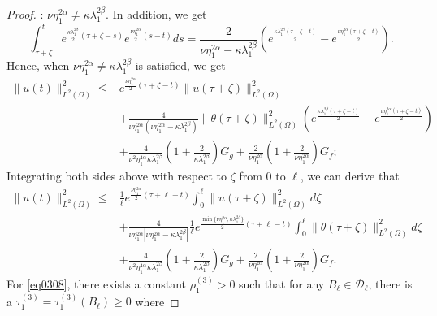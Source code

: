 \documentclass[10pt,a4paper]{amsart}
\begin{document}
\begin{proof}
: $\nu\eta_1^{2\alpha} \neq \kappa\lambda_1^{2\beta}$. In addition, we get
\[
\int_{\tau+\zeta}^{t} e^{\frac{\kappa\lambda_{1}^{2\beta}}{2}(\tau+\zeta-s)} e^{\frac{\nu\eta_1^{2\alpha}}{2}(s-t)} ds = \frac{2}{\nu\eta_1^{2\alpha} - \kappa\lambda_1^{2\beta}} \left( e^{\frac{\kappa\lambda_1^{2\beta}(\tau + \zeta - t)}{2}} - e^{\frac{\nu\eta_1^{2\alpha}(\tau + \zeta - t)}{2}} \right).
\]
Hence, when  \(\nu\eta_1^{2\alpha} \neq \kappa\lambda_1^{2\beta}\) is satisfied, we get
\begin{equation}\label{eq0305}
\begin{aligned} 
   \|u(t)\|_{L^2(\Omega)}^2
   \leq 
   & e^{\frac{\nu\eta_1^{2\alpha}}{2}(\tau+\zeta-t)} \|u(\tau+\zeta)\|_{L^2(\Omega)}^2 
    \\
   &
   + \frac{4}{\nu\eta_1^{2\alpha}(\nu\eta_1^{2\alpha} - \kappa\lambda_1^{2\beta})} \|\theta(\tau+\zeta)\|_{L^2(\Omega)}^2 
   \left( e^{\frac{\kappa\lambda_1^{2\beta}(\tau + \zeta - t)}{2}} - e^{\frac{\nu\eta_1^{2\alpha}(\tau + \zeta - t)}{2}} \right) \\
   &
   + \frac{4}{\nu^{2}\eta_1^{4\alpha}\kappa\lambda_{1}^{2\beta}}
   \left(1+\frac{2}{\kappa\lambda_{1}^{2\beta}}\right)
   G_g
   + \frac{2}{\nu\eta_1^{2\alpha}} \left(1+\frac{2}{\nu\eta_1^{2\alpha}}\right)G_f;
\end{aligned}
\end{equation}
Integrating both sides above with respect to $\zeta$ from $0$ to $\ell$, we can derive that
\begin{equation}\label{eq0308}
\begin{aligned} 
   \|u(t)\|_{L^2(\Omega)}^2
   \leq 
   & \frac{1}{\ell} e^{\frac{\nu\eta_1^{2\alpha}}{2}(\tau+\ell-t)}  \int_{0}^{\ell} \|u(\tau+\zeta)\|_{L^2(\Omega)}^2 d\zeta
    \\
   &
   + \frac{4}{\nu\eta_1^{2\alpha}|\nu\eta_1^{2\alpha} - \kappa\lambda_1^{2\beta}|}  
   \frac{1}{\ell}
   e^{\frac{\min\{\nu\eta_1^{2\alpha},\kappa\lambda_1^{2\beta}\}}{2}(\tau+\ell-t)}
   \int_{0}^{\ell} 
   \|\theta(\tau+\zeta)\|_{L^2(\Omega)}^2  d\zeta \\
   &
   +\frac{4}{\nu^{2}\eta_1^{4\alpha}\kappa\lambda_{1}^{2\beta}}
   \left(1+\frac{2}{\kappa\lambda_{1}^{2\beta}}\right)
   G_g
   + \frac{2}{\nu\eta_1^{2\alpha}} \left(1+\frac{2}{\nu\eta_1^{2\alpha}}\right)G_f.
\end{aligned}
\end{equation}
For \cref{eq0308}, there exists a constant $\rho_{1}^{(3)} > 0$ such that for any $B_{\ell} \in \mathcal{D}_{\ell}$, there is a $\tau_{1}^{(3)} = \tau_{1}^{(3)}(B_{\ell}) \geq 0$ where  

\end{proof}
\end{document}

